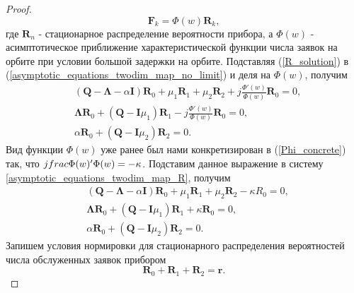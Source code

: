 \begin{proof}
\begin{equation} \label{R_solution}
	\boldsymbol{F}_{k} = \Phi(w)\boldsymbol{R}_{k},
\end{equation}
где $\boldsymbol{R}_{n}$ - стационарное распределение вероятности прибора, а $\Phi(w)$ - асимптотическое приближение характеристической функции числа заявок на орбите при условии большой задержки на орбите. Подставляя (\ref{R_solution}) в (\ref{asymptotic_equations_twodim_map_no_limit}) и деля на $\Phi(w)$, получим
\begin{equation}
	\label{asymptotic_equations_twodim_map_R}
	\begin{split}
		&(\boldsymbol{Q}-\boldsymbol{\Lambda}-\alpha\boldsymbol{I})\boldsymbol{R}_{0} + \mu_{1} \boldsymbol{R}_{1}  +  \mu_{2}\boldsymbol{R}_{2} + j
		\frac{\Phi'(w) }{\Phi(w)}\boldsymbol{R}_{0}  = 0,
		\\
		&\boldsymbol{\Lambda} \boldsymbol{R}_{0} +  (\boldsymbol{Q} - \boldsymbol{I}\mu_{1})\boldsymbol{R}_{1} - j\frac{\Phi'(w) }{\Phi(w)}
		\boldsymbol{R}_{0}  = 0,
		\\
		&\alpha \boldsymbol{R}_{0} + (\boldsymbol{Q} - \boldsymbol{I}\mu_{2})\boldsymbol{R}_{2}  = 0.
	\end{split}
\end{equation}
Вид функции $\Phi(w)$ уже ранее был нами конкретизирован в (\ref{Phi_concrete}) так, что $j\\frac{\Phi(w)'}{\Phi(w)} = -\kappa$. Подставим данное выражение в систему \ref{asymptotic_equations_twodim_map_R}, получим
\begin{equation}
	\label{asymptotic_equations_twodim_map_R_final}
	\begin{split}
		&(\boldsymbol{Q}-\boldsymbol{\Lambda}-\alpha\boldsymbol{I})\boldsymbol{R}_{0} + \mu_{1} \boldsymbol{R}_{1}  +  \mu_{2}\boldsymbol{R}_{2} -\kappa{R}_{0}  = 0,
		\\
		&\boldsymbol{\Lambda} \boldsymbol{R}_{0} +  (\boldsymbol{Q} - \boldsymbol{I}\mu_{1})\boldsymbol{R}_{1} + \kappa
		\boldsymbol{R}_{0}  = 0,
		\\
		&\alpha \boldsymbol{R}_{0} + (\boldsymbol{Q} - \boldsymbol{I}\mu_{2})\boldsymbol{R}_{2}  = 0.
	\end{split}
\end{equation}
Запишем условия нормировки для стационарного распределения вероятностей числа обслуженных заявок прибором
\begin{equation*}
	\boldsymbol{R}_{0} + \boldsymbol{R}_{1} + \boldsymbol{R}_{2} = \boldsymbol{r}.
\end{equation*}

\end{proof}
